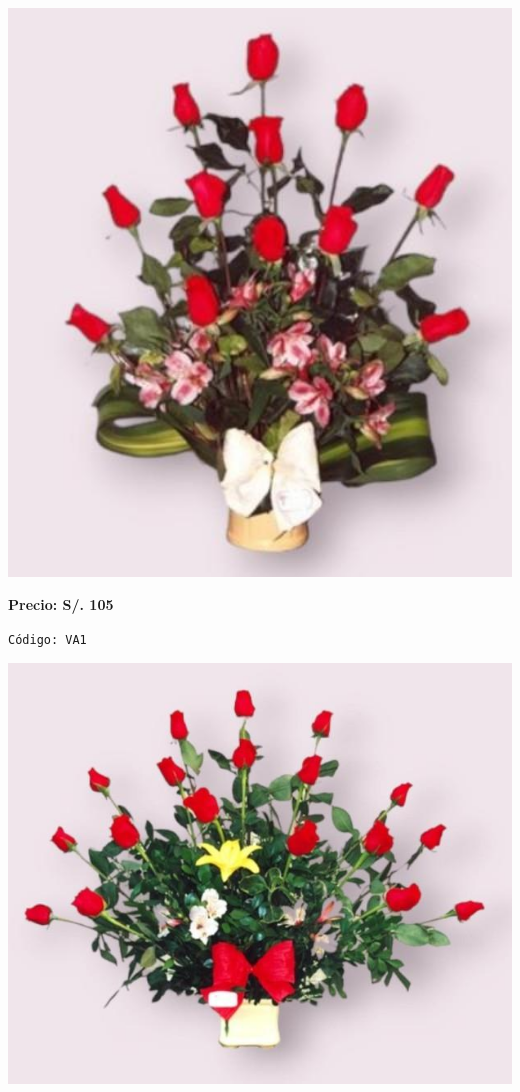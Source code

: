 \documentclass[12pt]{article}
\begin{document}
\begin{minipage}{0.35\textwidth}
    \includegraphics[width=1.0\textwidth]{imagenes_extraidas/image_10_3}
\end{minipage}
\vspace{0.3cm}
\begin{center}
   \textbf{\Large Precio: \textcolor[HTML]{228B22}{S/. 105 }}
\end{center}
\begin{center}
    \textcolor[HTML]{191970}{\texttt{Código: VA1}}
\end{center}
\vspace{1cm}
\noindent
\begin{minipage}{0.35\textwidth}
    \includegraphics[width=1.0\textwidth]{imagenes_extraidas/image_10_4}
\end{minipage}
\end{document}
